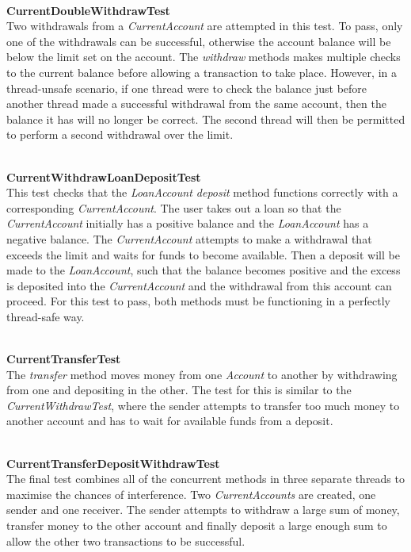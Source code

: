 \documentclass[a4paper,12pt]{article}
\begin{document}
\textbf{\\CurrentDoubleWithdrawTest}
\\Two withdrawals from a \textit{CurrentAccount} are attempted in this test. To pass, only one of the withdrawals can be successful, otherwise the account balance will be below the limit set on the account. The \textit{withdraw} methods makes multiple checks to the current balance before allowing a transaction to take place. However, in a thread-unsafe scenario, if one thread were to check the balance just before another thread made a successful withdrawal from the same account, then the balance it has will no longer be correct. The second thread will then be permitted to perform a second withdrawal over the limit.    

\textbf{\\CurrentWithdrawLoanDepositTest}
\\This test checks that the \textit{LoanAccount deposit} method functions correctly with a corresponding \textit{CurrentAccount}. The user takes out a loan so that the \textit{CurrentAccount} initially has a positive balance and the \textit{LoanAccount} has a negative balance. The \textit{CurrentAccount} attempts to make a withdrawal that exceeds the limit and waits for funds to become available. Then a deposit will be made to the \textit{LoanAccount}, such that the balance becomes positive and the excess is deposited into the \textit{CurrentAccount} and the withdrawal from this account can proceed. For this test to pass, both methods must be functioning in a perfectly thread-safe way.   

\textbf{\\CurrentTransferTest}
\\The \textit{transfer} method moves money from one \textit{Account} to another by withdrawing from one and depositing in the other. The test for this is similar to the \textit{CurrentWithdrawTest}, where the sender attempts to transfer too much money to another account and has to wait for available funds from a deposit.  

\textbf{\\CurrentTransferDepositWithdrawTest}
\\The final test combines all of the concurrent methods in three separate threads to maximise the chances of interference. Two \textit{CurrentAccounts} are created, one sender and one receiver. The sender attempts to withdraw a large sum of money, transfer money to the other account and finally deposit a large enough sum to allow the other two transactions to be successful.  
\end{document}
